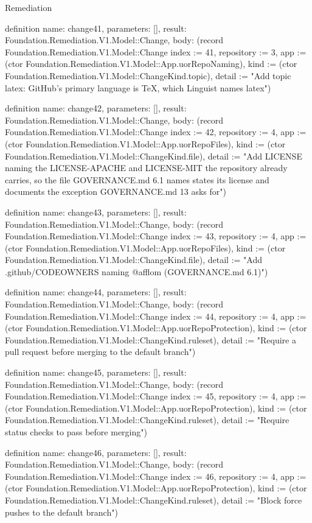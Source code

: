 \begin{lexlean}{Remediation}
\begin{semanticmodule}
definition{
  name: change41,
  parameters: [],
  result: Foundation.Remediation.V1.Model::Change,
  body: (record Foundation.Remediation.V1.Model::Change {index := 41, repository := 3, app := (ctor Foundation.Remediation.V1.Model::App.uorRepoNaming), kind := (ctor Foundation.Remediation.V1.Model::ChangeKind.topic), detail := "Add topic latex: GitHub's primary language is TeX, which Linguist names latex"})
}

definition{
  name: change42,
  parameters: [],
  result: Foundation.Remediation.V1.Model::Change,
  body: (record Foundation.Remediation.V1.Model::Change {index := 42, repository := 4, app := (ctor Foundation.Remediation.V1.Model::App.uorRepoFiles), kind := (ctor Foundation.Remediation.V1.Model::ChangeKind.file), detail := "Add LICENSE naming the LICENSE-APACHE and LICENSE-MIT the repository already carries, so the file GOVERNANCE.md 6.1 names states its license and documents the exception GOVERNANCE.md 13 asks for"})
}

definition{
  name: change43,
  parameters: [],
  result: Foundation.Remediation.V1.Model::Change,
  body: (record Foundation.Remediation.V1.Model::Change {index := 43, repository := 4, app := (ctor Foundation.Remediation.V1.Model::App.uorRepoFiles), kind := (ctor Foundation.Remediation.V1.Model::ChangeKind.file), detail := "Add .github/CODEOWNERS naming @afflom (GOVERNANCE.md 6.1)"})
}

definition{
  name: change44,
  parameters: [],
  result: Foundation.Remediation.V1.Model::Change,
  body: (record Foundation.Remediation.V1.Model::Change {index := 44, repository := 4, app := (ctor Foundation.Remediation.V1.Model::App.uorRepoProtection), kind := (ctor Foundation.Remediation.V1.Model::ChangeKind.ruleset), detail := "Require a pull request before merging to the default branch"})
}

definition{
  name: change45,
  parameters: [],
  result: Foundation.Remediation.V1.Model::Change,
  body: (record Foundation.Remediation.V1.Model::Change {index := 45, repository := 4, app := (ctor Foundation.Remediation.V1.Model::App.uorRepoProtection), kind := (ctor Foundation.Remediation.V1.Model::ChangeKind.ruleset), detail := "Require status checks to pass before merging"})
}

definition{
  name: change46,
  parameters: [],
  result: Foundation.Remediation.V1.Model::Change,
  body: (record Foundation.Remediation.V1.Model::Change {index := 46, repository := 4, app := (ctor Foundation.Remediation.V1.Model::App.uorRepoProtection), kind := (ctor Foundation.Remediation.V1.Model::ChangeKind.ruleset), detail := "Block force pushes to the default branch"})
}


\end{semanticmodule}
\end{lexlean}
